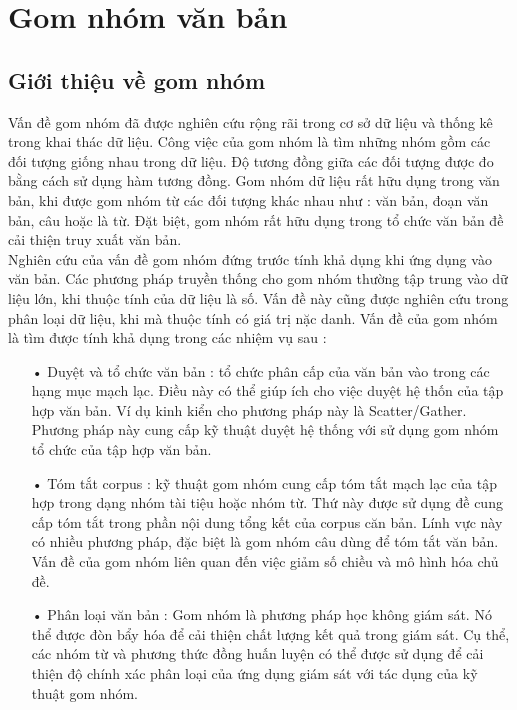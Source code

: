 \chapter{Gom nhóm văn bản}
\label{Chapter1}
\section{Giới thiệu về gom nhóm}
\hspace{10mm}Vấn đề gom nhóm đã được nghiên cứu rộng rãi trong cơ sở dữ liệu và thống kê trong khai thác dữ liệu. Công việc của gom nhóm là tìm những nhóm gồm các đối tượng giống nhau trong dữ liệu. Độ tương đồng giữa các đối tượng được đo bằng cách sử dụng hàm tương đồng. Gom nhóm dữ liệu rất hữu dụng trong văn bản, khi được gom nhóm từ các đối tượng khác nhau như : văn bản, đoạn văn bản, câu hoặc là từ. Đặt biệt, gom nhóm rất hữu dụng trong tổ chức văn bản đề cải thiện truy xuất văn bản.\\
\hspace*{10mm}Nghiên cứu của vấn đề gom nhóm đứng trước tính khả dụng khi ứng dụng vào văn bản. Các phương pháp truyền thống cho gom nhóm thường tập trung vào dữ liệu lớn, khi thuộc tính của dữ liệu là số. Vấn đề này cũng được nghiên cứu trong phân loại dữ liệu, khi mà thuộc tính có giá trị nặc danh. Vấn đề của gom nhóm là tìm được tính khả dụng trong các nhiệm vụ sau :
\begin{enumerate}
\item[•]Duyệt và tổ chức văn bản : tổ chức phân cấp của văn bản vào trong các hạng mục mạch lạc. Điều này có thể giúp ích cho việc duyệt hệ thốn của tập hợp văn bản. Ví dụ kinh kiển cho phương pháp này là Scatter/Gather. Phương pháp này cung cấp kỹ thuật duyệt hệ thống với sử dụng gom nhóm tổ chức của tập hợp văn bản.
\item[•]Tóm tắt corpus : kỹ thuật gom nhóm cung cấp tóm tắt mạch lạc của tập hợp trong dạng nhóm tài tiệu hoặc nhóm từ. Thứ này được sử dụng đề cung cấp tóm tắt trong phần nội dung tổng kết của corpus căn bản. Lính vực này có nhiều phương pháp, đặc biệt là gom nhóm câu dùng để tóm tắt văn bản. Vấn đề của gom nhóm liên quan đến việc giảm số chiều và mô hình hóa chủ đề. 
\item[•]Phân loại văn bản : Gom nhóm là phương pháp học không giám sát. Nó thể được đòn bẩy hóa để cải thiện chất lượng kết quả trong giám sát. Cụ thể, các nhóm từ và phương thức đồng huấn luyện có thể được sử dụng để cải thiện độ chính xác phân loại của ứng dụng giám sát với tác dụng của kỹ thuật gom nhóm.
\end{enumerate}

